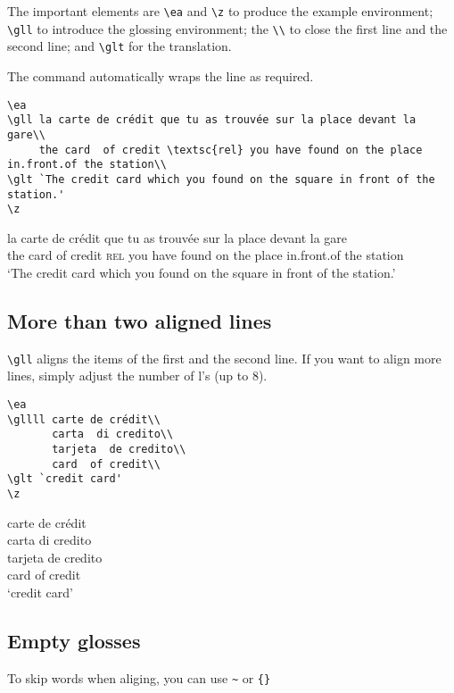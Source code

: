 \documentclass[output=paper]{langscibook}
\newcommand{\cmd}[1]{\texttt{\textbackslash#1}}
\begin{document}
The important elements are \cmd{ea} and \cmd{z} to produce the example environment; \cmd{gll} to introduce the glossing environment; the \texttt{\textbackslash\textbackslash} to close the first line and the second line; and \cmd{glt} for the translation. 

The command automatically wraps the line as required. 
\begin{lstlisting}
\ea
\gll la carte de crédit que tu as trouvée sur la place devant la gare\\
     the card  of credit \textsc{rel} you have found on the place in.front.of the station\\
\glt `The credit card which you found on the square in front of the station.'     
\z
 \end{lstlisting}
\ea
\gll la carte de crédit que tu as trouvée sur la place devant la gare\\
     the card  of credit \textsc{rel} you have found on the place in.front.of the station\\
\glt `The credit card which you found on the square in front of the station.'     
\z



\subsection{More than two aligned lines}
\cmd{gll} aligns the items of the first and the second line. If you want to align more lines, simply adjust the number of l's (up to 8).


\begin{minipage}{.55\textwidth}
\begin{lstlisting}
\ea
\gllll carte de crédit\\
       carta  di credito\\
       tarjeta  de credito\\
       card  of credit\\
\glt `credit card'     
\z
 \end{lstlisting}
\end{minipage}
\parbox{.45\textwidth}{ 
\ea
\gllll carte de crédit\\
       carta  di credito\\
       tarjeta  de credito\\
       card  of credit\\
\glt `credit card'     
\z
}


\subsection{Empty glosses}
To skip words when aliging, you can use \texttt{\textasciitilde} or \texttt{\{\}}
\end{document}
